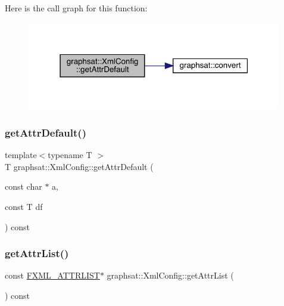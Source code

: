 Here is the call graph for this function\+:\nopagebreak
\begin{figure}[H]
\begin{center}
\leavevmode
\includegraphics[width=316pt]{classgraphsat_1_1_xml_config_a1b5a27e8192652ba81540aa9d167438c_cgraph}
\end{center}
\end{figure}
\mbox{\label{classgraphsat_1_1_xml_config_ac3a3bba85e42c9412494735ef25ca027}} 
\subsubsection{\texorpdfstring{getAttrDefault()}{getAttrDefault()}\hspace{0.1cm}{\footnotesize\ttfamily [2/2]}}
{\footnotesize\ttfamily template$<$typename T $>$ \\
T graphsat\+::\+Xml\+Config\+::get\+Attr\+Default (\begin{DoxyParamCaption}\item[{const char $\ast$}]{a,  }\item[{const T}]{df }\end{DoxyParamCaption}) const\hspace{0.3cm}{\ttfamily [inline]}}

\mbox{\label{classgraphsat_1_1_xml_config_a402172ca141ffd7b4ab7c24630a3ec0b}} 
\subsubsection{\texorpdfstring{getAttrList()}{getAttrList()}}
{\footnotesize\ttfamily const \mbox{\hyperlink{namespacegraphsat_ab40f1a7cacbf704e1869c944a7893ccc}{F\+X\+M\+L\+\_\+\+A\+T\+T\+R\+L\+I\+ST}}$\ast$ graphsat\+::\+Xml\+Config\+::get\+Attr\+List (\begin{DoxyParamCaption}{ }\end{DoxyParamCaption}) const\hspace{0.3cm}{\ttfamily [inline]}}

